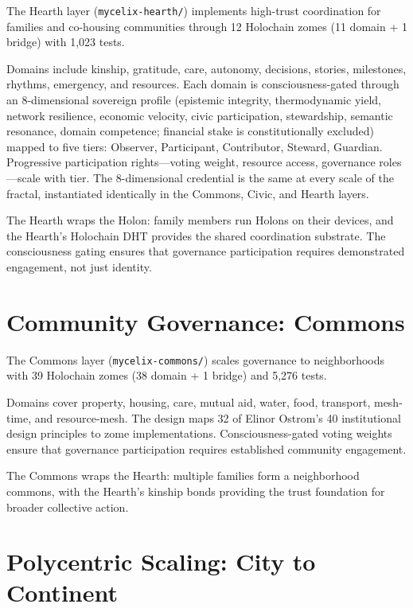 \documentclass[11pt,twocolumn]{article}
\begin{document}
The Hearth layer (\texttt{mycelix-hearth/}) implements high-trust coordination for families and co-housing communities through 12 Holochain zomes (11 domain + 1 bridge) with 1,023 tests.

Domains include kinship, gratitude, care, autonomy, decisions, stories, milestones, rhythms, emergency, and resources. Each domain is consciousness-gated through an 8-dimensional sovereign profile (epistemic integrity, thermodynamic yield, network resilience, economic velocity, civic participation, stewardship, semantic resonance, domain competence; financial stake is constitutionally excluded) mapped to five tiers: Observer, Participant, Contributor, Steward, Guardian. Progressive participation rights---voting weight, resource access, governance roles---scale with tier. The 8-dimensional credential is the same at every scale of the fractal, instantiated identically in the Commons, Civic, and Hearth layers.

The Hearth wraps the Holon: family members run Holons on their devices, and the Hearth's Holochain DHT provides the shared coordination substrate. The consciousness gating ensures that governance participation requires demonstrated engagement, not just identity.

\section{Community Governance: Commons}
\label{sec:commons}

The Commons layer (\texttt{mycelix-commons/}) scales governance to neighborhoods with 39 Holochain zomes (38 domain + 1 bridge) and 5,276 tests.

Domains cover property, housing, care, mutual aid, water, food, transport, mesh-time, and resource-mesh. The design maps 32 of Elinor Ostrom's 40 institutional design principles \cite{ostrom1990} to zome implementations. Consciousness-gated voting weights ensure that governance participation requires established community engagement.

The Commons wraps the Hearth: multiple families form a neighborhood commons, with the Hearth's kinship bonds providing the trust foundation for broader collective action.

\section{Polycentric Scaling: City to Continent}
\label{sec:polycenter}
\end{document}
